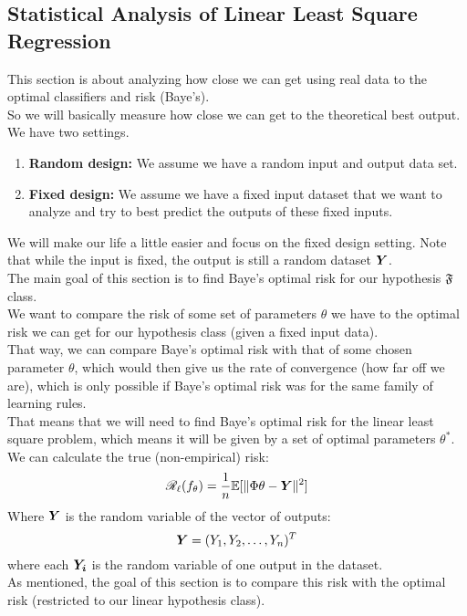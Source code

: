 \documentclass[12pt]{article}
\begin{document}
\subsection*{Statistical Analysis of Linear Least 
Square Regression}

This section is about analyzing how close we can
get using real data to the optimal classifiers
and risk (Baye's). \\

So we will basically measure how close we
can get to the theoretical best output. \\

We have two settings. \\
\begin{enumerate}
    \item 
    \textbf{Random design:} 
    We assume we have a random
    input and output data set.
    \item 
    \textbf{Fixed design:} 
    We assume we have a fixed input dataset that
    we want to analyze and try to best predict the 
    outputs of these fixed inputs. 
\end{enumerate}

We will make our life a little easier and
focus on the fixed design setting.
Note that while the input is fixed,
the output is still a random dataset $\boldsymbol{Y}$. \\

The main goal of this section is to
find Baye's optimal risk for our hypothesis
$\mathfrak{F}$ class. \\
We want to compare the risk of some
set of parameters $\theta$ we have to
the optimal risk we can get
for our hypothesis class (given a fixed
input data). \\
That way, we can compare Baye's optimal risk
with that of some chosen parameter $\theta$,
which would then give us the rate of convergence
(how far off we are),
which is only possible if Baye's optimal risk
was for the same family of learning rules. \\
That means that we will need to find
Baye's optimal risk for the linear least square
problem, which means it will be given
by a set of optimal parameters $\theta^*$. \\

We can calculate the true (non-empirical)
risk:
\[ \mathscr{R}_{\ell}{}(f_\theta) = 
\dfrac{1}{n}\mathbb{E}[\|\Phi \theta - \boldsymbol{Y}\|^2] \]
Where $\boldsymbol{Y}$
is the random variable of the vector of outputs:
\[ \boldsymbol{Y} = (Y_1,Y_2, \dots, Y_n)^T \]
where each $\boldsymbol{Y_i}$
is the random variable of one output in the dataset. \\
As mentioned, the goal of this section
is to compare this risk with the optimal risk
(restricted to our linear hypothesis class). \\
\end{document}

